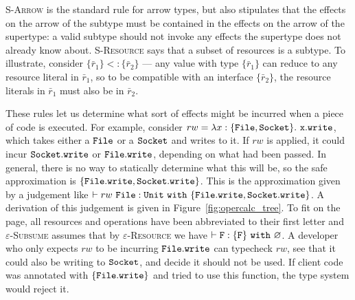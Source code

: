 \textsc{S-Arrow} is the standard rule for arrow types, but also stipulates that the effects on the arrow of the subtype must be contained in the effects on the arrow of the supertype: a valid subtype should not invoke any effects the supertype does not already know about. \textsc{S-Resource} says that a subset of resources is a subtype. To illustrate, consider $\{ \bar r_1 \} <: \{ \bar r_2 \}$ --- any value with type $\{ \bar r_1 \}$ can reduce to any resource literal in $\bar r_1$, so to be compatible with an interface $\{ \bar r_2 \}$, the resource literals in $\bar r_1$ must also be in $\bar r_2$.

These rules let us determine what sort of effects might be incurred when a piece of code is executed. For example, consider $rw = \lambda x: \{ \mathtt{File, Socket} \}.~\mathtt{x.write}$, which takes either a $\mathtt{File}$ or a $\mathtt{Socket}$ and writes to it. If $rw$ is applied, it could incur $\mathtt{Socket.write}$ or $\mathtt{File.write}$, depending on what had been passed. In general, there is no way to statically determine what this will be, so the safe approximation is $\{ \mathtt{File.write, Socket.write} \}$. This is the approximation given by a judgement like $\vdash rw~\mathtt{File}: \mathtt{Unit}~\mathtt{with}~ \{ \mathtt{File.write, Socket.write} \}$. A derivation of this judgement is given in Figure~\ref{fig:opercalc_tree}. To fit on the page, all resources and operations have been abbreviated to their first letter and \textsc{$\varepsilon$-Subsume} assumes that by \textsc{$\varepsilon$-Resource} we have $\vdash \mathtt{F}: \{ \mathtt{F} \}~\mathtt{with}~ \varnothing$. A developer who only expects $rw$ to be incurring $\mathtt{File.write}$ can typecheck $rw$, see that it could also be writing to $\mathtt{Socket}$, and decide it should not be used. If client code was annotated with $\mathtt{ \{ \mathtt{File.write} \} }$ and tried to use this function, the type system would reject it.


